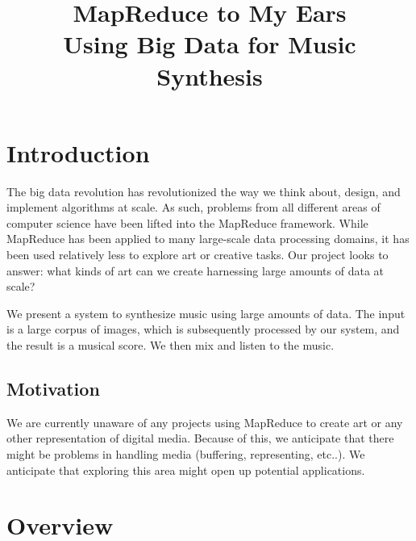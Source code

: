 \documentclass[10pt, conference, compsocconf]{IEEEtran}
\begin{document}
%

\title{MapReduce to My Ears\\
{\Large Using Big Data for Music Synthesis}
}

\author{
}

\maketitle

\begin{abstract}

\end{abstract}

\section{Introduction}
\label{sec:introduction}

The big data revolution has revolutionized the way we think about,
design, and implement algorithms at scale.  As such, problems from all
different areas of computer science have been lifted into the
MapReduce framework.  While MapReduce has been applied to many
large-scale data processing domains, it has been used relatively less
to explore art or creative tasks.  Our project looks to answer: what
kinds of art can we create harnessing large amounts of data at scale?

We present a system to synthesize music using large amounts of data.
The input is a large corpus of images, which is subsequently processed
by our system, and the result is a musical score.  We then mix and
listen to the music.

\subsection{Motivation} 

We are currently unaware of any projects using MapReduce to create art
or any other representation of digital media.  Because of this, we
anticipate that there might be problems in handling media (buffering,
representing, etc..).  We anticipate that exploring this area might
open up potential applications.

\section{Overview}
\label{sec:overview}
\end{document}
